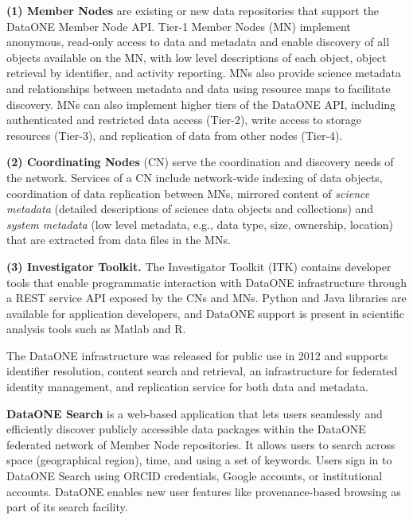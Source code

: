 \documentclass[a4paper]{llncs}
\newcommand{\mypara}[1]{\vspace{4pt}\noindent\textbf{#1}}
\begin{document}
\mypara{(1) Member Nodes} are existing or new data repositories that support the DataONE Member Node API.  Tier-1 Member Nodes (MN) implement anonymous, read-only access to data and metadata and enable discovery of all objects available on the MN, with low level descriptions of each object, object retrieval by identifier, and activity reporting. MNs also provide science metadata and relationships between metadata and data using resource maps \cite{oaiore} to facilitate discovery.  MNs can also implement higher tiers of the DataONE API, including authenticated and restricted data access (Tier-2), write access to storage resources (Tier-3), and replication of data from other nodes (Tier-4).


\mypara{(2) Coordinating Nodes} (CN) serve the coordination and discovery needs of the network. Services of a CN include network-wide indexing of data objects, coordination of data replication between MNs, mirrored content of \emph{science metadata} (detailed descriptions of science data objects and collections) and \emph{system metadata} (low level metadata, e.g., data type, size, ownership, location) that are extracted from data files in the MNs.


\mypara{(3) Investigator Toolkit.} The Investigator Toolkit (ITK) contains developer tools that enable programmatic interaction with DataONE infrastructure through a REST service API exposed by the CNs and MNs. Python and Java libraries are available for application developers, and DataONE support is present in scientific analysis tools such as Matlab and R.


The DataONE infrastructure was released for public use in 2012 and supports identifier resolution, content search and retrieval, an infrastructure for federated identity management, and replication service for both data and metadata.


\mypara{DataONE Search} is a web-based application that lets users seamlessly and efficiently discover publicly accessible data packages within the DataONE federated network of Member Node repositories. It allows users to search across space (geographical region), time, and using a set of keywords. Users sign in to DataONE Search using ORCID credentials, Google accounts, or institutional accounts. DataONE enables new user features like provenance-based browsing as part of its search facility.
\end{document}

